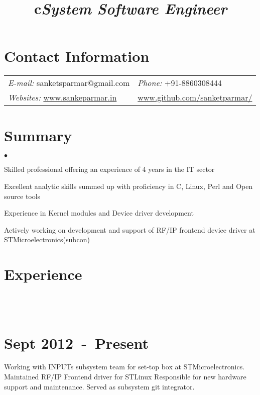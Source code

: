 \documentclass[margin,line]{res}
\newcommand{\datesection}[1]{\section{\textnormal{\scriptsize \textcolor{subtle}{#1}}}}
\newenvironment{list2}{
  \begin{list}{$\bullet$}{%
      \setlength{\itemsep}{0in}
      \setlength{\parsep}{0in} \setlength{\parskip}{0in}
      \setlength{\topsep}{0in} \setlength{\partopsep}{0in}
      \setlength{\leftmargin}{0.2in}}}{\end{list}}
\begin{document}

\begin{resume}
\section{\sc Contact Information}
\vspace{.05in}
\begin{tabular}{@{}p{2.5in}p{4in}}
{\it E-mail:} sanketsparmar@gmail.com  & {\it Phone:}  +91-8860308444 \\
{\it Websites:} \url{www.sankeparmar.in} & \url{www.github.com/sanketparmar/} \\
\end{tabular}

\section{\sc Summary}
\begin{list2}
\item Skilled professional offering an experience of 4 years in the IT sector
\item Excellent analytic skills summed up with proficiency in C, Linux, Perl and Open source tools
\item Experience in Kernel modules and Device driver development
\item Actively working on development and support of RF/IP frontend device driver at STMicroelectronics(subcon)
\end{list2}

\section{\sc Experience}

\begin{format}
		\title{c}\\
		\body\\
\end{format}

\datesection{Sept 2012~-~Present}
\title{\em System Software Engineer}
\begin{position}
Working with INPUTs subsystem team for set-top box at STMicroelectronics. Maintained RF/IP Frontend driver for STLinux
Responsible for new hardware support and maintenance. Served as subsystem git integrator.
\end{position}


\end{resume}
\end{document}
